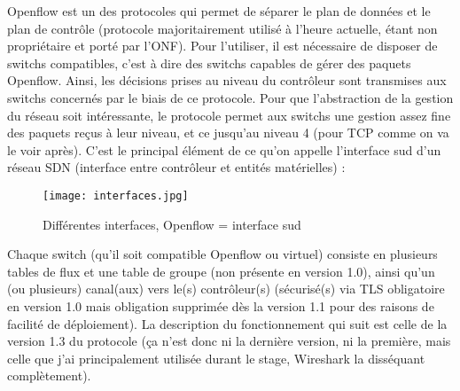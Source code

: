 Openflow est un des protocoles qui permet de séparer le plan de données et le plan de contrôle (protocole majoritairement utilisé à l'heure actuelle, étant non propriétaire et porté par l'ONF). Pour l'utiliser, il est nécessaire de disposer de switchs compatibles, c'est à dire des switchs capables de gérer des paquets Openflow. Ainsi, les décisions prises au niveau du contrôleur sont transmises aux switchs concernés par le biais de ce protocole. Pour que l'abstraction de la gestion du réseau soit intéressante, le protocole permet aux switchs une gestion assez fine des paquets reçus à leur niveau, et ce jusqu'au niveau 4 (pour TCP comme on va le voir après). C'est le principal élément de ce qu'on appelle l'interface sud d'un réseau SDN (interface entre contrôleur et entités matérielles) :
\begin{figure}[h]
  	\centering
  	\texttt{[image: interfaces.jpg]}
  	\caption{Différentes interfaces, Openflow = interface sud}
\end{figure}

Chaque switch (qu'il soit compatible Openflow ou virtuel) consiste en plusieurs tables de flux et une table de groupe (non présente en version 1.0), ainsi qu'un (ou plusieurs) canal(aux) vers le(s) contrôleur(s) (sécurisé(s) via TLS obligatoire en version 1.0 mais obligation supprimée dès la version 1.1 pour des raisons de facilité de déploiement). La description du fonctionnement qui suit est celle de la version 1.3 du protocole (ça n'est donc ni la dernière version, ni la première, mais celle que j'ai principalement utilisée durant le stage, Wireshark la disséquant complètement).\\

